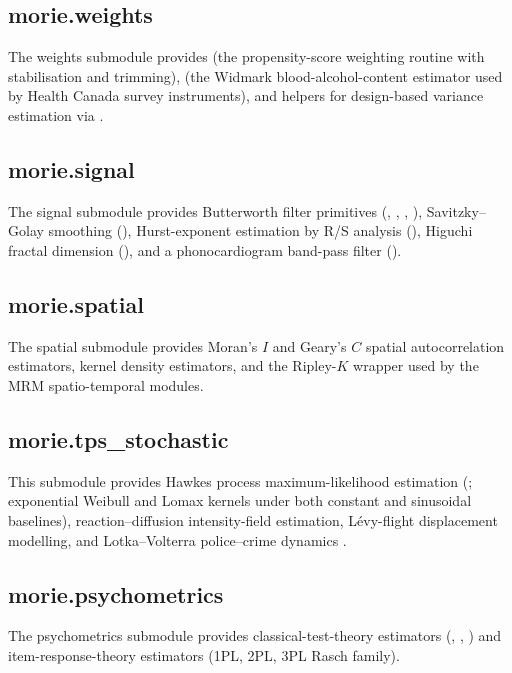 \documentclass[article,shortnames,nojss]{jss}
\begin{document}
\subsection{morie.weights}

The weights submodule provides
 (the propensity-score
weighting routine with stabilisation and trimming),
 (the Widmark
blood-alcohol-content estimator used by Health Canada survey
instruments), and helpers for design-based variance estimation
via .

\subsection{morie.signal}

The signal submodule provides Butterworth filter primitives
(, , , ),
Savitzky--Golay smoothing (), Hurst-exponent
estimation by R/S analysis (), Higuchi fractal
dimension (), and a phonocardiogram band-pass filter
().

\subsection{morie.spatial}

The spatial submodule provides Moran's $I$ and Geary's $C$
spatial autocorrelation estimators, kernel density estimators,
and the Ripley-$K$ wrapper used by the MRM spatio-temporal
modules.

\subsection[morie.tps stochastic]{morie.tps\_stochastic}

This submodule provides Hawkes process maximum-likelihood
estimation (; exponential
Weibull and Lomax kernels under both constant and sinusoidal baselines), reaction--diffusion intensity-field
estimation, L\'evy-flight displacement modelling, and
Lotka--Volterra police--crime dynamics
\citep{Mohler2011, Ruhela2026Hawkes}.

\subsection{morie.psychometrics}

The psychometrics submodule provides classical-test-theory
estimators (, ,
) and item-response-theory estimators
(1PL, 2PL, 3PL Rasch family).
\end{document}
